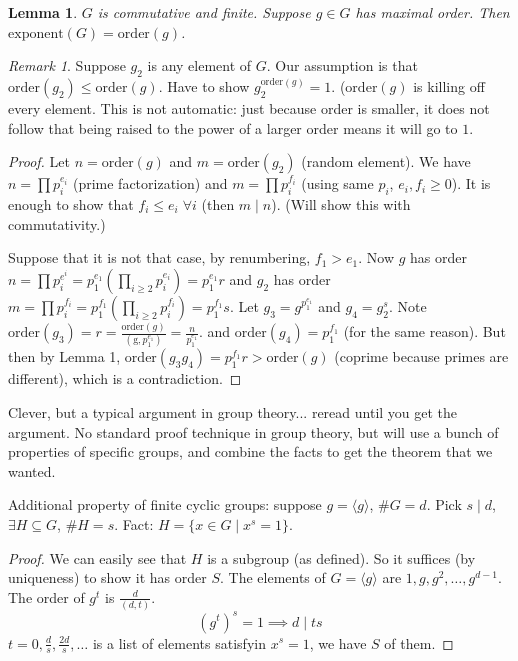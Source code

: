 \documentclass{article}
\theoremstyle{plain}
\newtheorem{lemma}{Lemma}
\theoremstyle{remark}
\newtheorem{remark}{Remark}
\begin{document}
\begin{lemma}
	$G$ is commutative and finite.
	Suppose $g \in G$ has maximal order.
	Then $\mathrm{exponent}(G) = \mathrm{order}(g)$.
\end{lemma}
\begin{remark}
	Suppose $g_2$ is any element of $G$.
	Our assumption is that $\mathrm{order}(g_2) \leq \mathrm{order}(g)$.
	Have to show $g_2^{\mathrm{order}(g)} = 1$.
	($\mathrm{order}(g)$ is killing off every element.
	This is not automatic: just because order is smaller,
	it does not follow that being raised to the power of a larger order
	means it will go to $1$.
\end{remark}
\begin{proof}
	Let $n = \mathrm{order}(g)$ and $m = \mathrm{order}(g_2)$ (random element).
	We have $n = \prod p_i^{e_i}$ (prime factorization)
	and $m = \prod p_i^{f_i}$ (using same $p_i$, $e_i,f_i \geq 0$).
	It is enough to show that $f_i \leq e_i \;\forall i$ (then $m \mid n$).
	(Will show this with commutativity.)

	Suppose that it is not that case,
	by renumbering, $f_1 > e_1$.
	Now $g$ has order $n = \prod p_i^{e^i} =
	p_1^{e_1}\left(\prod_{i\geq 2} p_i^{e_i}\right) = p_1^{e_1}r$
	and $g_2$ has order $m = \prod p_i^{f_i} =
	p_1^{f_1}\left(\prod_{i\geq 2} p_i^{f_i}\right) = p_1^{f_1}s$.
	Let $g_3 = g^{p_1^{e_1}}$ and $g_4 = g_2^s$.
	Note $\mathrm{order}(g_3) = r = \frac{\mathrm{order}(g)}
	{(\mathrm{g}, p_1^{e_1})} = \frac{n}{p_1^{e_1}}$.
	and $\mathrm{order}(g_4) = p_1^{f_1}$ (for the same reason).
	But then by Lemma 1, $\mathrm{order}(g_3g_4) = p_1^{f_1}r > \mathrm{order}(g)$
	(coprime because primes are different),
	which is a contradiction.
\end{proof}
Clever, but a typical argument in group theory... reread until you get the argument.
No standard proof technique in group theory,
but will use a bunch of properties of specific groups,
and combine the facts to get the theorem that we wanted.

Additional property of finite cyclic groups:
suppose $g = \langle g \rangle$, $\# G = d$.
Pick $s \mid d$, $\exists H \subseteq G$, $\# H = s$.
Fact: $H = \{x \in G \mid x^s = 1\}$.
\begin{proof}
	We can easily see that $H$ is a subgroup (as defined).
	So it suffices (by uniqueness) to show it has order $S$.
	The elements of $G = \langle g \rangle$ are $1,g,g^2, \dots, g^{d-1}$.
	The order of $g^t$ is $\frac{d}{(d,t)}$.
	\[
		(g^t)^s = 1 \implies d \mid ts
	\]
	$t = 0, \frac{d}{s}, \frac{2d}{s}, \dots$ is a list of elements
	satisfyin $x^s = 1$, we have $S$ of them.
\end{proof}
\end{document}
